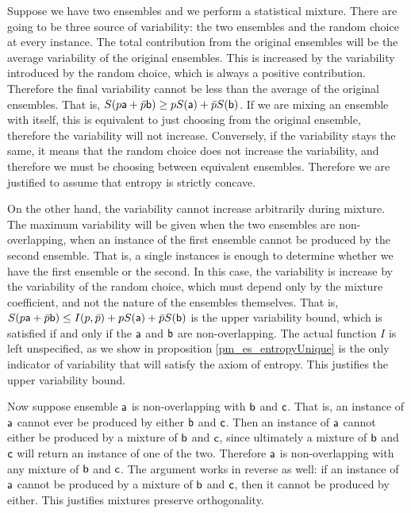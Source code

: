 \begin{justification}
	Suppose we have two ensembles and we perform a statistical mixture. There are going to be three source of variability: the two ensembles and the random choice at every instance. The total contribution from the original ensembles will be the average variability of the original ensembles. This is increased by the variability introduced by the random choice, which is always a positive contribution. Therefore the final variability cannot be less than the average of the original ensembles. That is, $S(p\ens[a] + \bar{p} \ens[b]) \geq p S(\ens[a]) + \bar{p} S(\ens[b])$. If we are mixing an ensemble with itself, this is equivalent to just choosing from the original ensemble, therefore the variability will not increase. Conversely, if the variability stays the same, it means that the random choice does not increase the variability, and therefore we must be choosing between equivalent ensembles. Therefore we are justified to assume that entropy is strictly concave.
	
	On the other hand, the variability cannot increase arbitrarily during mixture. The maximum variability will be given when the two ensembles are non-overlapping, when an instance of the first ensemble cannot be produced by the second ensemble. That is, a single instances is enough to determine whether we have the first ensemble or the second. In this case, the variability is increase by the variability of the random choice, which must depend only by the mixture coefficient, and not the nature of the ensembles themselves. That is, $S(p\ens[a] + \bar{p} \ens[b]) \leq I(p, \bar{p}) + p S(\ens[a]) + \bar{p} S(\ens[b])$ is the upper variability bound, which is satisfied if and only if the $\ens[a]$ and $\ens[b]$ are non-overlapping. The actual function $I$ is left unspecified, as we show in proposition \ref{pm_es_entropyUnique} is the only indicator of variability that will satisfy the axiom of entropy. This justifies the upper variability bound.
	
	Now suppose ensemble $\ens[a]$ is non-overlapping with $\ens[b]$ and $\ens[c]$. That is, an instance of $\ens[a]$ cannot ever be produced by either $\ens[b]$ and $\ens[c]$. Then an instance of $\ens[a]$ cannot either be produced by a mixture of $\ens[b]$ and $\ens[c]$, since ultimately a mixture of $\ens[b]$ and $\ens[c]$ will return an instance of one of the two. Therefore $\ens[a]$ is non-overlapping with any mixture of $\ens[b]$ and $\ens[c]$. The argument works in reverse as well: if an instance of $\ens[a]$ cannot be produced by a mixture of $\ens[b]$ and $\ens[c]$, then it cannot be produced by either. This justifies mixtures preserve orthogonality.
\end{justification}

